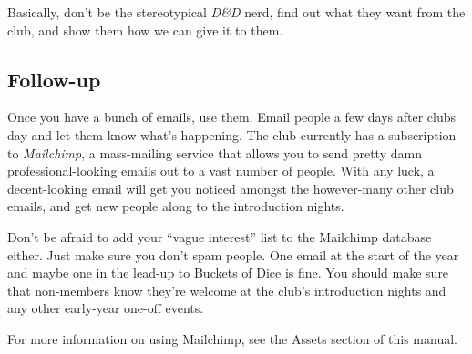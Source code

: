 Basically, don't be the stereotypical \textit{D\&D} nerd, find out what they want from the club, and show them how we can give it to them.

\subsection{Follow-up}

Once you have a bunch of emails, use them. Email people a few days after clubs day and let them know what's happening. The club currently has a subscription to \textit{Mailchimp}, a mass-mailing service that allows you to send pretty damn professional-looking emails out to a vast number of people. With any luck, a decent-looking email will get you noticed amongst the however-many other club emails, and get new people along to the introduction nights.

Don't be afraid to add your ``vague interest'' list to the Mailchimp database either. Just make sure you don't spam people. One email at the start of the year and maybe one in the lead-up to Buckets of Dice is fine. You should make sure that non-members know they're welcome at the club's introduction nights and any other early-year one-off events.

For more information on using Mailchimp, see the Assets section of this manual.